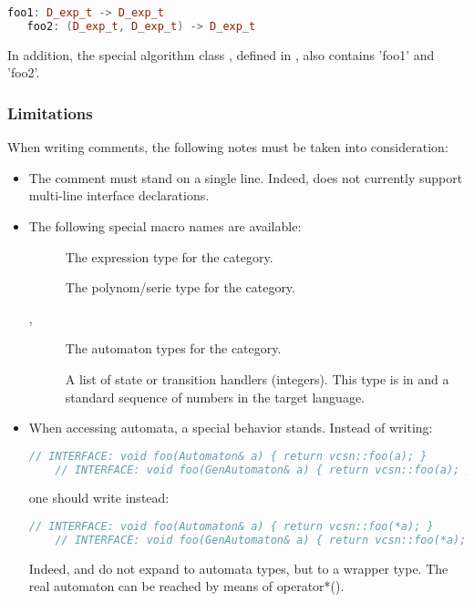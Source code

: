 \begin{lstlisting}[language=C++]
   foo1: D_exp_t -> D_exp_t
   foo2: (D_exp_t, D_exp_t) -> D_exp_t
\end{lstlisting}

In   addition,  the   special  algorithm   class  ,   defined  in
, also contains 'foo1' and 'foo2'.

\subsubsection{Limitations}

When writing   comments, the following  notes must be
taken into consideration:

\begin{itemize}
\item The comment must stand on a single line.  Indeed,
   does not currently support multi-line interface
  declarations.

\item The following special macro names are available:

  \begin{description}
  \item[] The expression type for the category.
  \item[] The polynom/serie type for the category.
  \item[, ] The automaton types for
    the category.
  \item[] A list of state or transition handlers
    (integers). This type is  in \Cxx and a
    standard sequence of numbers in the target language.
  \end{description}

\item When accessing automata, a special behavior stands. Instead of
  writing:

  \begin{lstlisting}[language=C++]
    // INTERFACE: void foo(Automaton& a) { return vcsn::foo(a); }
    // INTERFACE: void foo(GenAutomaton& a) { return vcsn::foo(a); }
  \end{lstlisting}

  one should write instead:

  \begin{lstlisting}[language=C++]
    // INTERFACE: void foo(Automaton& a) { return vcsn::foo(*a); }
    // INTERFACE: void foo(GenAutomaton& a) { return vcsn::foo(*a); }
  \end{lstlisting}

  Indeed,     and    do   not  expand  to
  \Vauc automata types, but to  a wrapper type. The real automaton
  can be reached by means of operator*().

\end{itemize}

